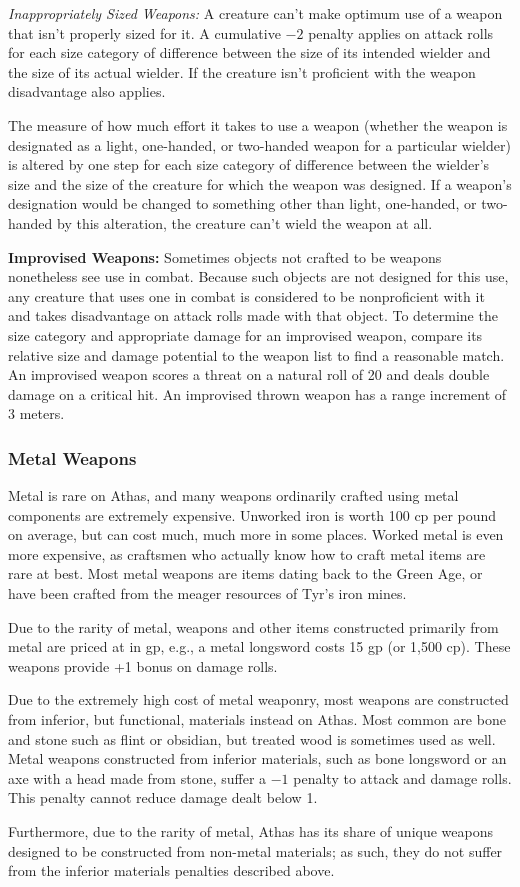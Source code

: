 \textit{Inappropriately Sized Weapons:} A creature can't make optimum use of a weapon that isn't properly sized for it. A cumulative $-2$ penalty applies on attack rolls for each size category of difference between the size of its intended wielder and the size of its actual wielder. If the creature isn't proficient with the weapon disadvantage also applies.

The measure of how much effort it takes to use a weapon (whether the weapon is designated as a light, one-handed, or two-handed weapon for a particular wielder) is altered by one step for each size category of difference between the wielder's size and the size of the creature for which the weapon was designed. If a weapon's designation would be changed to something other than light, one-handed, or two-handed by this alteration, the creature can't wield the weapon at all.

\textbf{Improvised Weapons:} Sometimes objects not crafted to be weapons nonetheless see use in combat. Because such objects are not designed for this use, any creature that uses one in combat is considered to be nonproficient with it and takes disadvantage on attack rolls made with that object. To determine the size category and appropriate damage for an improvised weapon, compare its relative size and damage potential to the weapon list to find a reasonable match. An improvised weapon scores a threat on a natural roll of 20 and deals double damage on a critical hit. An improvised thrown weapon has a range increment of 3 meters.

\subsubsection{Metal Weapons}
Metal is rare on Athas, and many weapons ordinarily crafted using metal components are extremely expensive. Unworked iron is worth 100 cp per pound on average, but can cost much, much more in some places. Worked metal is even more expensive, as craftsmen who actually know how to craft metal items are rare at best. Most metal weapons are items dating back to the Green Age, or have been crafted from the meager resources of Tyr's iron mines.

Due to the rarity of metal, weapons and other items constructed primarily from metal are priced at in gp, e.g., a metal longsword costs 15 gp (or 1,500 cp). These weapons provide +1 bonus on damage rolls.

Due to the extremely high cost of metal weaponry, most weapons are constructed from inferior, but functional, materials instead on Athas. Most common are bone and stone such as flint or obsidian, but treated wood is sometimes used as well. Metal weapons constructed from inferior materials, such as bone longsword or an axe with a head made from stone, suffer a $-1$ penalty to attack and damage rolls. This penalty cannot reduce damage dealt below 1.

Furthermore, due to the rarity of metal, Athas has its share of unique weapons designed to be constructed from non-metal materials; as such, they do not suffer from the inferior materials penalties described above.
